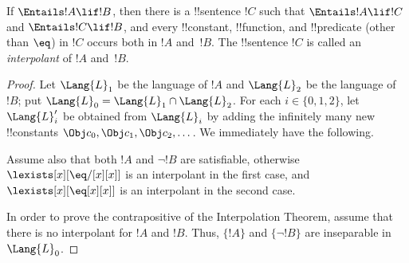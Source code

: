 \documentclass[../../include/open-logic-section]{subfiles}
\begin{document}


\begin{thm}
If $\Entails !A \lif !B$, then there is a !!{sentence} $!C$ such that
$\Entails !A \lif !C$ and $\Entails !C \lif !B$, and every
!!{constant}, !!{function}, and !!{predicate} (other than $\eq$) in
$!C$ occurs both in $!A$ and~$!B$. The !!{sentence} $!C$ is called an
\emph{interpolant} of $!A$ and~$!B$.
\end{thm}

\begin{proof}
Let $\Lang{L}_1$ be the language of $!A$ and $\Lang{L}_2$ be the
language of $!B$; put $\Lang{L}_0 = \Lang{L}_1 \cap \Lang{L}_2$. For
each $i \in \{0, 1, 2 \}$, let $\Lang{L}'_i$ be obtained from
$\Lang{L}_i$ by adding the infinitely many new !!{constant}s $\Obj c_0,
\Obj c_1, \Obj c_2, \dots$. We immediately have the following.

Assume also that both $!A$ and $\lnot !B$ are satisfiable, otherwise
$\lexists[x][\eq/[x][x]]$ is an interpolant in the first case, and
$\lexists[x][\eq[x][x]]$ is an interpolant in the second case.

In order to prove the contrapositive of the Interpolation Theorem, assume
that there is no interpolant for $!A$ and $!B$. Thus, $\{ !A \}$ and
$\{\lnot!B\}$ are inseparable in $\Lang{L}_0$.


\end{proof}
\end{document}
